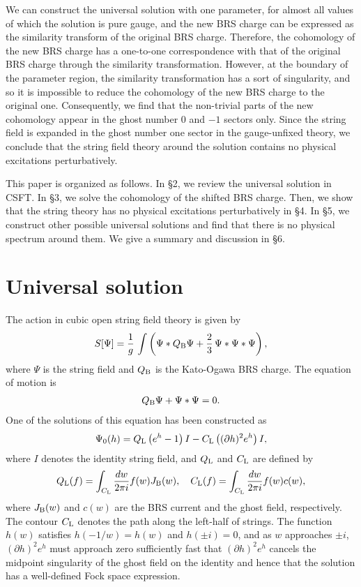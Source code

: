 \documentclass[a4paper,seceq,preprint]{ptptex}
\newcommand{\dz}[1]{\frac{d #1}{2\pi i}}
\newcommand{\rL}{{\rm L}}
\newcommand{\Q}{Q_{\rm B}}
\begin{document}
We can construct the universal solution with one parameter, for 
almost all values of which the solution is pure gauge, and the
new BRS charge can be expressed as the similarity transform of the
original BRS charge. Therefore, the cohomology of the new BRS charge has
a one-to-one correspondence with that of the original BRS charge
through the similarity transformation. However, at the boundary of the
parameter region, the similarity transformation has a sort of
singularity, and so it is impossible to reduce the cohomology of the new
BRS charge to the original one.
Consequently, we find that the non-trivial parts of the
new cohomology appear in the ghost number $0$ and $-1$ sectors only.  
Since the string field
is expanded in the ghost number one sector
in the gauge-unfixed theory, we conclude that the string field
theory around the solution contains no physical excitations
perturbatively.

This paper is organized as follows. In \S 2, we review the
universal solution in CSFT. In \S 3, we solve the cohomology of the
shifted BRS charge. Then, we show that the string theory has no physical
excitations perturbatively in \S 4.
In \S 5, we construct other possible universal solutions and find
that there is no physical spectrum around them.
We give a summary and discussion in \S 6.



\section{Universal solution}

The action in cubic open string field theory is given by
\begin{eqnarray}
 S[\Psi] = \frac{1}{g}\,\int \left( \Psi*\Q \Psi 
+ \frac{2}{3}\,\Psi*\Psi*\Psi\right),
\end{eqnarray}
where $\Psi$ is the string field and $\Q$ is the Kato-Ogawa BRS charge.
The equation of motion is
\begin{eqnarray}
 \Q\Psi+\Psi*\Psi=0.
\end{eqnarray}
One of the solutions of this equation has been constructed as\cite{rf:TT2}
\begin{eqnarray}
\label{Eq:solution}
 \Psi_0(h) = Q_\rL\left(e^h-1\right) I 
             -C_\rL\left((\partial h)^2 e^h \right) I,
\end{eqnarray}
where $I$ denotes the identity string field, and $Q_\rL$ and $C_\rL$ are
defined by
\begin{eqnarray}
 Q_\rL(f) = \int_{C_\rL} \dz{w} f(w) J_{\rm B}(w),\ \ \ 
 C_\rL(f) = \int_{C_\rL} \dz{w} f(w) c(w),
\end{eqnarray}
where $J_{\rm B}(w)$ and $c(w)$ are the BRS current and the ghost field,
respectively. 
The contour $C_\rL$ denotes the path along the left-half of 
strings. 
The function $h(w)$ satisfies $h(-1/w)=h(w)$ and $h(\pm i)=0$, and
as $w$ approaches $\pm i$, $(\partial h)^2 e^h$ must approach zero
sufficiently fast that $(\partial h)^2 e^h$ cancels 
the midpoint singularity of the ghost field on the identity and hence
that the solution has
a well-defined Fock space expression.
\end{document}
